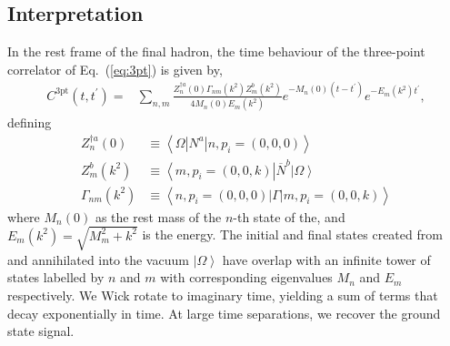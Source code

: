\documentclass{PoS}
\begin{document}
\subsection{Interpretation}
In the rest frame of the final hadron, the time behaviour of the three-point correlator of Eq.~(\ref{eq:3pt}) is given by,
\begin{align}
C^{\text{3pt}}(t, t^\prime)  = & \sum_{n,m} \frac{Z_n^{\dagger a}(0) \Gamma_{nm}(k^2)Z_m^b(k^2)}{4 M_n(0) E_m(k^2)} e^{-M_n(0)(t - t^\prime)} e^{-E_m(k^2) t^\prime} \label{eq:3ptfit},
\end{align}
defining
\begin{align}
Z_n^{\dagger a}(0) &\equiv\left<\Omega | N^a | n, p_i=\left(0, 0, 0\right) \right>
\\
Z_m^b(k^2) &\equiv \left<m, p_i=\left(0,0,k\right)\right| \overline{N}^b\left|\Omega\right>\\
\Gamma_{nm}(k^2) &\equiv \left<n,p_i=\left(0,0,0\right)| \Gamma | m, p_i=\left(0,0,k\right) \right>
\end{align}
where $M_n(0)$ as the rest mass of the $n$-th state of the, and $E_m(k^2) = \sqrt{M_m^2+k^2}$ is the energy. The initial and final states created from and annihilated into the vacuum $\left|\Omega\right>$ have overlap with an infinite tower of states labelled by $n$ and $m$ with corresponding eigenvalues $M_n$ and $E_m$ respectively. We Wick rotate to imaginary time, yielding a sum of terms that decay exponentially in time. At large time separations, we recover the ground state signal.
\end{document}
